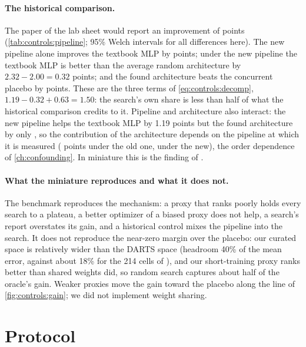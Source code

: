 \begin{refsection}
\paragraph{The historical comparison.} The paper of the lab sheet would report an improvement of  points (\cref{tab:controls:pipeline}; 95\% Welch intervals for all differences here). The new pipeline alone improves the textbook MLP by  points; under the new pipeline the textbook MLP is better than the average random architecture by $2.32-2.00=0.32$ points; and the found architecture beats the concurrent placebo by  points. These are the three terms of \eqref{eq:controls:decomp}, $1.19-0.32+0.63=1.50$: the search's own share is less than half of what the historical comparison credits to it. Pipeline and architecture also interact: the new pipeline helps the textbook MLP by 1.19 points but the found architecture by only , so the contribution of the architecture depends on the pipeline at which it is measured ( points under the old one,  under the new), the order dependence of \cref{ch:confounding}. In miniature this is the finding of \textcite{YangEsperancaCarlucci2020}.

\paragraph{What the miniature reproduces and what it does not.} The benchmark reproduces the mechanism: a proxy that ranks poorly holds every search to a plateau, a better optimizer of a biased proxy does not help, a search's report overstates its gain, and a historical control mixes the pipeline into the search. It does not reproduce the near-zero margin over the placebo: our curated space is relatively wider than the DARTS space (headroom 40\% of the mean error, against about 18\% for the 214 cells of \textcite{YangEsperancaCarlucci2020}), and our short-training proxy ranks better than shared weights did, so random search captures about half of the oracle's gain. Weaker proxies move the gain toward the placebo along the line of \cref{fig:controls:gain}; we did not implement weight sharing.

\section{Protocol}\label{sec:controls:protocol}


\end{refsection}
